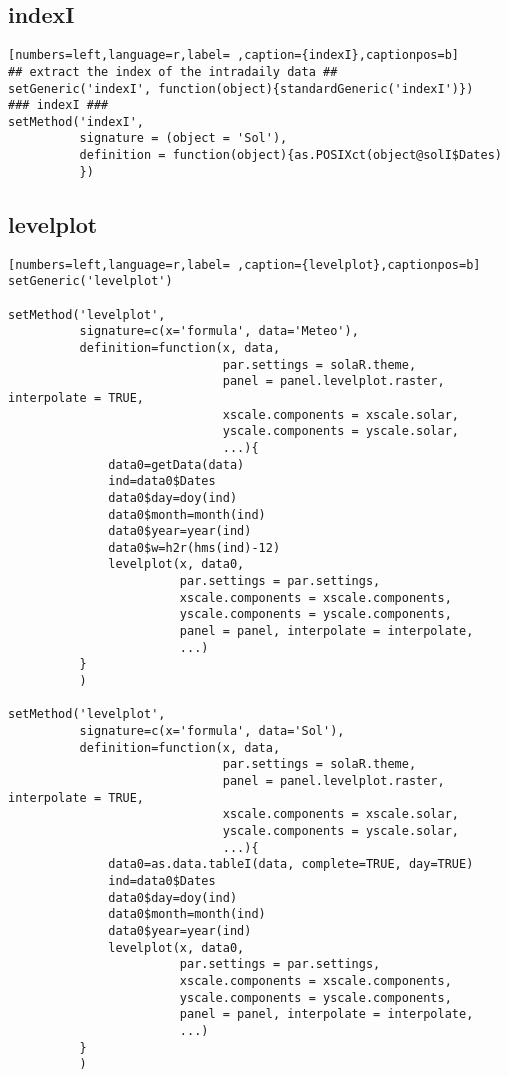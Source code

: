 \subsection{indexI}
\label{sec:orgb51b43e}
\begin{lstlisting}[numbers=left,language=r,label= ,caption={indexI},captionpos=b]
## extract the index of the intradaily data ##
setGeneric('indexI', function(object){standardGeneric('indexI')})
### indexI ###
setMethod('indexI',
          signature = (object = 'Sol'),
          definition = function(object){as.POSIXct(object@solI$Dates)
          })
\end{lstlisting}
\subsection{levelplot}
\label{sec:orgb115f8e}
\begin{lstlisting}[numbers=left,language=r,label= ,caption={levelplot},captionpos=b]
setGeneric('levelplot')

setMethod('levelplot',
          signature=c(x='formula', data='Meteo'),
          definition=function(x, data,
                              par.settings = solaR.theme,
                              panel = panel.levelplot.raster, interpolate = TRUE,
                              xscale.components = xscale.solar,
                              yscale.components = yscale.solar,
                              ...){
              data0=getData(data)
              ind=data0$Dates
              data0$day=doy(ind)
              data0$month=month(ind)
              data0$year=year(ind)
              data0$w=h2r(hms(ind)-12)
              levelplot(x, data0,
                        par.settings = par.settings,
                        xscale.components = xscale.components,
                        yscale.components = yscale.components,
                        panel = panel, interpolate = interpolate,
                        ...)
          }
          )

setMethod('levelplot',
          signature=c(x='formula', data='Sol'),
          definition=function(x, data,
                              par.settings = solaR.theme,
                              panel = panel.levelplot.raster, interpolate = TRUE,
                              xscale.components = xscale.solar,
                              yscale.components = yscale.solar,
                              ...){
              data0=as.data.tableI(data, complete=TRUE, day=TRUE)
              ind=data0$Dates
              data0$day=doy(ind)
              data0$month=month(ind)
              data0$year=year(ind)
              levelplot(x, data0,
                        par.settings = par.settings,
                        xscale.components = xscale.components,
                        yscale.components = yscale.components,
                        panel = panel, interpolate = interpolate,
                        ...)
          }
          )


\end{lstlisting}
